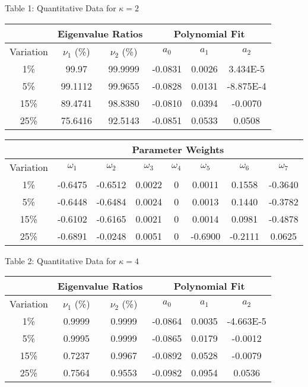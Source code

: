\documentclass{article}
\begin{document}
\newpage
\begin{center}
Table 1: Quantitative Data for $\kappa = 2$

\begin{tabular}{|c||c|c||c|c|c|}
	\hline & \multicolumn{2}{c||}{\textbf{Eigenvalue Ratios}} & \multicolumn{3}{c|}{\textbf{Polynomial Fit}} \\ \hline
	Variation & $\nu_1$ (\%) & $\nu_2$ (\%) & $a_0$ & $a_1$ & $a_2$ \\ \hline \hline
	1\% & 99.97 & 99.9999 & -0.0831 & 0.0026 & 3.434E-5 \\ \hline
	5\% & 99.1112 & 99.9655 & -0.0828 & 0.0131 & -8.875E-4 \\ \hline
	15\% & 89.4741 & 98.8380 & -0.0810 & 0.0394 & -0.0070 \\ \hline
	25\% & 75.6416 & 92.5143 & -0.0851 & 0.0533 & 0.0508 \\ \hline
\end{tabular}

\begin{tabular}{|c||c|c|c|c|c|c|c|}
	\hline & \multicolumn{7}{c|}{\textbf{Parameter Weights}} \\ \hline
	Variation & $\omega_1$ & $\omega_2$ & $\omega_3$ & $\omega_4$ & $\omega_5$ & $\omega_6$ & $\omega_7$ \\ \hline \hline
	1\% & -0.6475 & -0.6512 & 0.0022 & 0 & 0.0011 & 0.1558 & -0.3640 \\ \hline
	5\% & -0.6448 & -0.6484 & 0.0024 & 0 & 0.0013 & 0.1440 & -0.3782 \\ \hline
	15\% & -0.6102 & -0.6165 & 0.0021 & 0 & 0.0014 & 0.0981 & -0.4878 \\ \hline
	25\% & -0.6891 & -0.0248 & 0.0051 & 0 & -0.6900 & -0.2111 & 0.0625 \\ \hline
\end{tabular}


\vspace{0.5in} Table 2: Quantitative Data for $\kappa = 4$

\begin{tabular}{|c||c|c||c|c|c|}
	\hline & \multicolumn{2}{c||}{\textbf{Eigenvalue Ratios}} & \multicolumn{3}{c|}{\textbf{Polynomial Fit}} \\ \hline
	Variation & $\nu_1$ (\%) & $\nu_2$ (\%) & $a_0$ & $a_1$ & $a_2$ \\ \hline \hline
	1\% & 0.9999 & 0.9999 & -0.0864 & 0.0035 & -4.663E-5 \\ \hline
	5\% & 0.9995 & 0.9999 & -0.0865 & 0.0179 & -0.0012 \\ \hline
	15\% & 0.7237 & 0.9967 & -0.0892 & 0.0528 & -0.0079 \\ \hline
	25\% & 0.7564 & 0.9553 & -0.0982 & 0.0954 & 0.0536 \\ \hline
\end{tabular}


\end{center}
\end{document}
